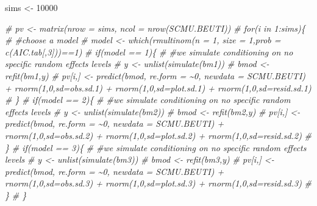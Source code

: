\documentclass[
]{article}
\newenvironment{Shaded}{\begin{snugshade}}{\end{snugshade}}
\newcommand{\CommentTok}[1]{\textcolor[rgb]{0.56,0.35,0.01}{\textit{#1}}}
\newcommand{\DecValTok}[1]{\textcolor[rgb]{0.00,0.00,0.81}{#1}}
\newcommand{\NormalTok}[1]{#1}
\newcommand{\OtherTok}[1]{\textcolor[rgb]{0.56,0.35,0.01}{#1}}
\begin{document}
\begin{Shaded}
\begin{Highlighting}[]
\NormalTok{sims }\OtherTok{\textless{}{-}} \DecValTok{10000}

\CommentTok{\# pv \textless{}{-} matrix(nrow = sims, ncol = nrow(SCMU.BEUTI))}
\CommentTok{\# for(i in 1:sims)\{}
\CommentTok{\#   \#choose a model }
\CommentTok{\#   model \textless{}{-} which(rmultinom(n = 1, size = 1,prob = c(AIC.tab[,3]))==1)}
\CommentTok{\#   if(model == 1)\{}
\CommentTok{\#     \#we simulate conditioning on no specific random effects levels}
\CommentTok{\#     y \textless{}{-} unlist(simulate(bm1))}
\CommentTok{\#     bmod \textless{}{-} refit(bm1,y)}
\CommentTok{\#     pv[i,] \textless{}{-} predict(bmod, re.form = \textasciitilde{}0, newdata = SCMU.BEUTI) + rnorm(1,0,sd=obs.sd.1) + rnorm(1,0,sd=plot.sd.1) + rnorm(1,0,sd=resid.sd.1)}
\CommentTok{\#   \}}
\CommentTok{\#   if(model == 2)\{}
\CommentTok{\#     \#we simulate conditioning on no specific random effects levels}
\CommentTok{\#     y \textless{}{-} unlist(simulate(bm2))}
\CommentTok{\#     bmod \textless{}{-} refit(bm2,y)}
\CommentTok{\#     pv[i,] \textless{}{-} predict(bmod, re.form = \textasciitilde{}0, newdata = SCMU.BEUTI) + rnorm(1,0,sd=obs.sd.2) + rnorm(1,0,sd=plot.sd.2) + rnorm(1,0,sd=resid.sd.2)}
\CommentTok{\#   \}}
\CommentTok{\#   if(model == 3)\{}
\CommentTok{\#     \#we simulate conditioning on no specific random effects levels}
\CommentTok{\#     y \textless{}{-} unlist(simulate(bm3))}
\CommentTok{\#     bmod \textless{}{-} refit(bm3,y)}
\CommentTok{\#     pv[i,] \textless{}{-} predict(bmod, re.form = \textasciitilde{}0, newdata = SCMU.BEUTI) + rnorm(1,0,sd=obs.sd.3) + rnorm(1,0,sd=plot.sd.3) + rnorm(1,0,sd=resid.sd.3)}
\CommentTok{\#   \}}
\CommentTok{\# \}  }


\end{Highlighting}
\end{Shaded}
\end{document}
